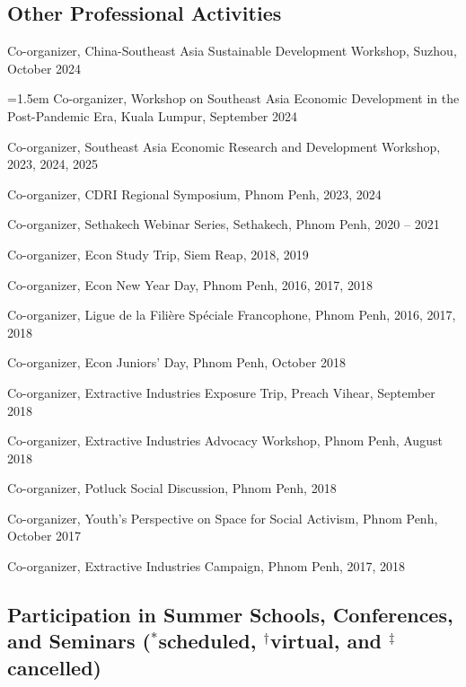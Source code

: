 \documentclass[10pt,a4paper]{article}
\begin{document}
\subsection*{Other Professional Activities}

	Co-organizer, China-Southeast Asia Sustainable Development Workshop, Suzhou, October 2024

	\hangindent=1.5em
	Co-organizer, Workshop on Southeast Asia Economic Development in the Post-Pandemic Era, Kuala Lumpur, September 2024

	Co-organizer, Southeast Asia Economic Research and Development Workshop, 2023, 2024, 2025
	
	Co-organizer, CDRI Regional Symposium, Phnom Penh, 2023, 2024
	
	Co-organizer, Sethakech Webinar Series, Sethakech, Phnom Penh, 2020 -- 2021

	Co-organizer, Econ Study Trip, Siem Reap, 2018, 2019

	Co-organizer, Econ New Year Day, Phnom Penh, 2016, 2017, 2018

	Co-organizer, Ligue de la Filière Spéciale Francophone, Phnom Penh, 2016, 2017, 2018
		
	Co-organizer, Econ Juniors' Day, Phnom Penh, October 2018
		
	Co-organizer, Extractive Industries Exposure Trip, Preach Vihear, September 2018

	Co-organizer, Extractive Industries Advocacy Workshop, Phnom Penh, August 2018
		
	Co-organizer, Potluck Social Discussion, Phnom Penh, 2018
			
	Co-organizer, Youth's Perspective on Space for Social Activism, Phnom Penh, October 2017
		
	Co-organizer, Extractive Industries Campaign, Phnom Penh, 2017, 2018


\subsection*{Participation in Summer Schools, Conferences, and Seminars ($^\ast$scheduled, $^\dag$virtual, and $^\ddag$cancelled)}
\end{document}
